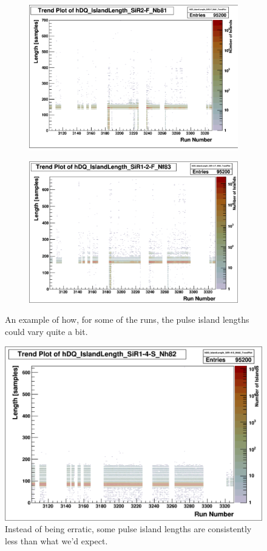 \documentclass[a4paper]{article}
\begin{document}
\begin{figure}
  \begin{subfigure}{0.5\textwidth}
    \includegraphics[width=0.9\linewidth]{figs/al50a/sir2f_length}
  \end{subfigure}%
  \begin{subfigure}{0.5\textwidth}
    \includegraphics[width=0.9\linewidth]{figs/al50a/sir12f_length}
  \end{subfigure}
  \caption{An example of how, for some of the runs, the pulse island lengths could vary quite a bit.}
  \label{fig:al50a_erratic_lengths}
\end{figure}

\begin{figure}
  \centering
  \includegraphics[width=0.9\linewidth]{figs/al50a/sir14s_length}
  \caption{Instead of being erratic, some pulse island lengths are consistently less than what we'd expect.}
  \label{fig:al50a_consistent_bad_lengths}
\end{figure}
\end{document}
